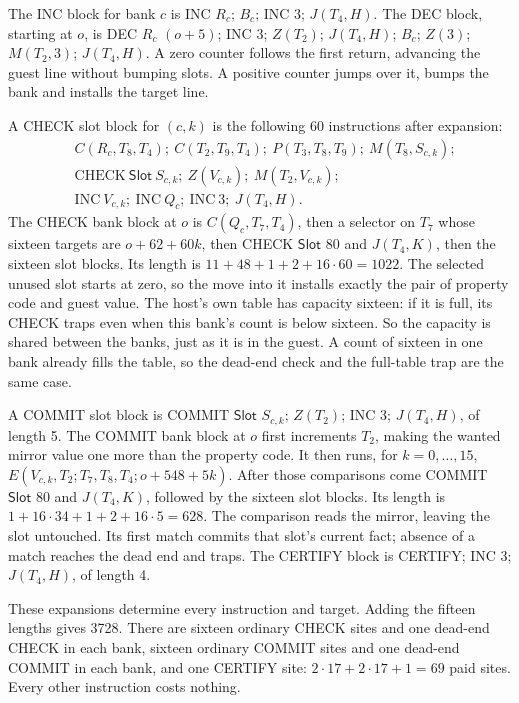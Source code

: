 \documentclass[11pt,twoside]{article}
\theoremstyle{thielethm}
\theoremstyle{thieledef}
\theoremstyle{thieledef}
\theoremstyle{thieledef}
\theoremstyle{thielethm}
\theoremstyle{thieleobs}
\theoremstyle{thielethm}
\begin{document}
The INC block for bank $c$ is INC $R_c$; $B_c$; INC 3; $J(T_4,H)$.
The DEC block, starting at $o$, is
DEC $R_c$ $(o+5)$; INC 3; $Z(T_2)$; $J(T_4,H)$;
$B_c$; $Z(3)$; $M(T_2,3)$; $J(T_4,H)$.
A zero counter follows the first return, advancing the guest line without bumping
slots. A positive counter jumps over it, bumps the bank and installs the target line.

A CHECK slot block for $(c,k)$ is the following 60 instructions after expansion:
\[
\begin{aligned}
&C(R_c,T_8,T_4);\ C(T_2,T_9,T_4);\ P(T_3,T_8,T_9);\ M(T_8,S_{c,k});\\
&\mathrm{CHECK}\ \mathsf{Slot}\ S_{c,k};\ Z(V_{c,k});\ M(T_2,V_{c,k});\\
&\mathrm{INC}\ V_{c,k};\ \mathrm{INC}\ Q_c;\ \mathrm{INC}\ 3;\ J(T_4,H).
\end{aligned}
\]
The CHECK bank block at $o$ is $C(Q_c,T_7,T_4)$, then a selector on $T_7$ whose
sixteen targets are $o+62+60k$, then CHECK $\mathsf{Slot}$ 80 and $J(T_4,K)$,
then the sixteen slot blocks. Its length is
$11+48+1+2+16\cdot60=1022$.
The selected unused slot starts at zero, so the move into it installs exactly the
pair of property code and guest value. The host's own table has capacity sixteen:
if it is full, its CHECK traps even when this bank's count is below sixteen.
So the capacity is shared between the banks, just as it is in the guest. A count of sixteen in one bank already fills the table, so the dead-end check and the full-table trap are the same case.

A COMMIT slot block is COMMIT $\mathsf{Slot}$ $S_{c,k}$;
$Z(T_2)$; INC 3; $J(T_4,H)$, of length 5.
The COMMIT bank block at $o$ first increments $T_2$, making the wanted mirror value
one more than the property code. It then runs, for $k=0,\ldots,15$,
$E(V_{c,k},T_2;T_7,T_8,T_4;o+548+5k)$.
After those comparisons come COMMIT $\mathsf{Slot}$ 80 and $J(T_4,K)$, followed
by the sixteen slot blocks. Its length is $1+16\cdot34+1+2+16\cdot5=628$.
The comparison reads the mirror, leaving the slot untouched. Its first match
commits that slot's current fact; absence of a match reaches the dead end and traps.
The CERTIFY block is CERTIFY; INC 3; $J(T_4,H)$, of length 4.

These expansions determine every instruction and target. Adding the fifteen lengths
gives 3728. There are sixteen ordinary CHECK sites and one dead-end CHECK in each
bank, sixteen ordinary COMMIT sites and one dead-end COMMIT in each bank, and one
CERTIFY site: $2\cdot17+2\cdot17+1=69$ paid sites. Every other instruction costs nothing.
\end{document}

